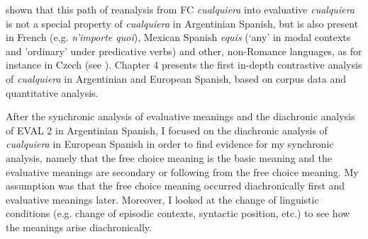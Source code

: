 \documentclass[output=paper]{langscibook}
\begin{document}
shown that this path of reanalysis from FC \textit{cualquiera} into evaluative \textit{cualquiera} is not a special property of \textit{cualquiera} in Argentinian Spanish, but is also present in French (e.g. \textit{n’importe quoi}), Mexican Spanish \textit{equis} (‘any’ in modal contexts and ’ordinary’ under predicative verbs) \citep{Author2020} and other, non-Romance languages, as for instance in Czech (see \citealt{Šimík2008}). Chapter 4 presents the first in-depth contrastive analysis of \textit{cualquiera} in Argentinian and European Spanish, based on corpus data and quantitative analysis. 

  After the synchronic analysis of evaluative meanings and the diachronic analysis of EVAL 2 in Argentinian Spanish, I focused on the diachronic analysis of \textit{cualquiera} in European Spanish in order to find evidence for my synchronic analysis, namely that the free choice meaning is the basic meaning and the evaluative meanings are secondary or following from the free choice meaning. My assumption was that the free choice meaning occurred diachronically first and evaluative meanings later. Moreover, I looked at the change of linguistic conditions (e.g. change of episodic contexts, syntactic position, etc.) to see how the meanings arise diachronically. 
\end{document}
